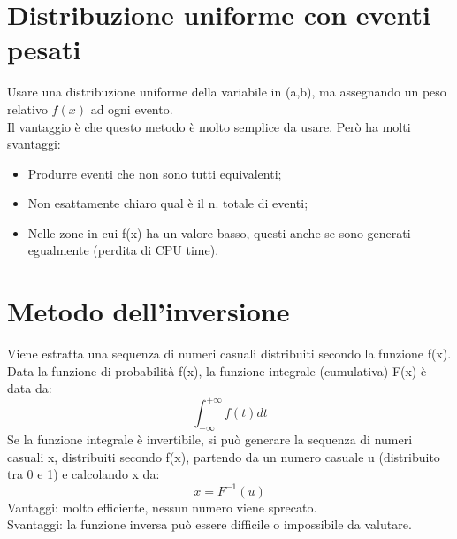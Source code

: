\documentclass[12pt, letterpaper]{book}
\begin{document}
\section{Distribuzione uniforme con eventi pesati}
Usare una distribuzione uniforme della variabile in (a,b), ma assegnando un peso relativo $f(x)$ ad ogni evento.\\
Il vantaggio è che questo metodo è molto semplice da usare. Però ha molti svantaggi:
\begin{itemize}
    \item Produrre eventi che non sono tutti equivalenti;
    \item Non esattamente chiaro qual è il n. totale di eventi;
    \item Nelle zone in cui f(x) ha un valore basso, questi anche se sono generati egualmente (perdita di CPU time).
\end{itemize}

\section{Metodo dell’inversione}
Viene estratta una sequenza di numeri casuali distribuiti secondo la funzione f(x).\\
Data la funzione di probabilità f(x), la funzione integrale (cumulativa) F(x) è data da:
$$\int_{-\infty}^{+\infty}f(t)dt$$
Se la funzione integrale è invertibile, si può generare la sequenza di numeri casuali x, distribuiti secondo f(x), partendo da un numero casuale u (distribuito tra 0 e 1) e 
calcolando x da:
$$x=F^{-1}(u)$$
Vantaggi: molto efficiente, nessun numero viene sprecato.\\
Svantaggi: la funzione inversa può essere difficile o impossibile da valutare.
\end{document}
